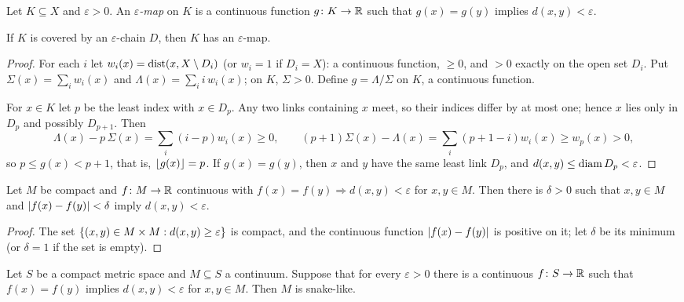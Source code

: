 \begin{definition}\label{def:epsmap}
Let $K\subseteq X$ and $\varepsilon>0$. An \emph{$\varepsilon$-map} on $K$ is a continuous function
$g\colon K\to\mathbb{R}$ such that $g(x)=g(y)$ implies $d(x,y)<\varepsilon$.
\end{definition}

\begin{proposition}\label{prop:chain-epsmap}
If $K$ is covered by an $\varepsilon$-chain $D$, then $K$ has an $\varepsilon$-map.
\end{proposition}

\begin{proof}
For each $i$ let $w_i(x)=\operatorname{dist}(x,X\setminus D_i)$ (or $w_i=1$ if $D_i=X$): a continuous function, $\ge0$,
and $>0$ exactly on the open set $D_i$. Put $\Sigma(x)=\sum_iw_i(x)$ and $\Lambda(x)=\sum_i i\,w_i(x)$; on
$K$, $\Sigma>0$. Define $g=\Lambda/\Sigma$ on $K$, a continuous function.

For $x\in K$ let $p$ be the least index with $x\in D_p$. Any two links containing $x$ meet, so their
indices differ by at most one; hence $x$ lies only in $D_p$ and possibly $D_{p+1}$. Then
\[
\Lambda(x)-p\,\Sigma(x)=\sum_i(i-p)w_i(x)\ge0,\qquad(p+1)\Sigma(x)-\Lambda(x)=\sum_i(p+1-i)w_i(x)\ge
w_p(x)>0,
\]
so $p\le g(x)<p+1$, that is, $\left\lfloor g(x)\right\rfloor=p$. If $g(x)=g(y)$, then $x$ and $y$ have the same least link
$D_p$, and $d(x,y)\le\operatorname{diam} D_p<\varepsilon$.
\end{proof}


\begin{lemma}\label{lem:uniform-fibres}
Let $M$ be compact and $f\colon M\to\mathbb{R}$ continuous with $f(x)=f(y)\Rightarrow d(x,y)<\varepsilon$ for
$x,y\in M$. Then there is $\delta>0$ such that $x,y\in M$ and $\left\lvert f(x)-f(y)\right\rvert<\delta$ imply
$d(x,y)<\varepsilon$.
\end{lemma}

\begin{proof}
The set $\left\{ (x,y)\in M\times M:d(x,y)\ge\varepsilon \right\}$ is compact, and the continuous function
$\left\lvert f(x)-f(y)\right\rvert$ is positive on it; let $\delta$ be its minimum (or $\delta=1$ if the set is empty).
\end{proof}


\begin{theorem}\label{thm:epsmap-criterion}
Let $S$ be a compact metric space and $M\subseteq S$ a continuum. Suppose that for every
$\varepsilon>0$ there is a continuous $f\colon S\to\mathbb{R}$ such that $f(x)=f(y)$ implies $d(x,y)<\varepsilon$
for $x,y\in M$. Then $M$ is snake-like.
\end{theorem}

